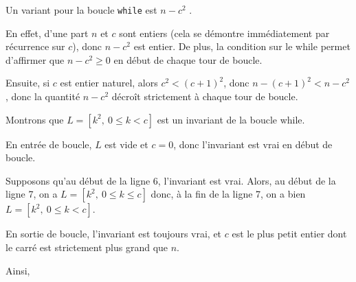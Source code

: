 \question{} Un variant pour la boucle \texttt{while} est \og $n - c^2$ \fg{}. 

En effet, d'une part $n$ et $c$ sont entiers (cela se démontre immédiatement par récurrence sur $c$), donc $n-c^2$ est entier. 
De plus, la condition sur le while permet d'affirmer que $n-c^2 \geq 0$ en début de chaque tour de boucle. 

Ensuite, si $c$ est entier naturel, alors $c^2 < (c+1)^2$, donc $n-(c+1)^2 < n-c^2$, donc la quantité $n-c^2$ décroît strictement à chaque tour de boucle. 


\medskip{}

\question{}
Montrons que \og $L = [k^2,~ 0 \leq k < c]$ \fg{} est un invariant de la boucle while. 

En entrée de boucle, $L$ est vide et $c=0$, donc l'invariant est vrai en début de boucle.

Supposons qu'au début de la ligne 6, l'invariant est vrai. Alors, au début de la ligne 7, on a $L = [k^2,~ 0 \leq k \leq c]$ donc, à la fin de la ligne 7, on a bien $L = [k^2,~ 0 \leq k < c]$. 


En sortie de boucle, l'invariant est toujours vrai, et $c$ est le plus petit entier dont le carré est strictement plus grand que $n$. 

Ainsi, 